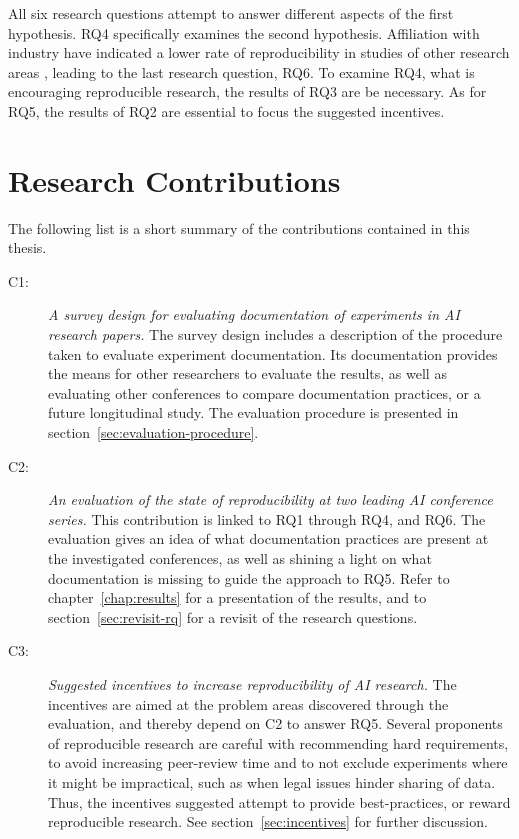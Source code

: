 All six research questions attempt to answer different aspects of the first hypothesis. RQ4 specifically examines the second hypothesis. Affiliation with industry have indicated a lower rate of reproducibility in studies of other research areas \citep{Collberg2016}, leading to the last research question, RQ6. To examine RQ4, what is encouraging reproducible research, the results of RQ3 are be necessary. As for RQ5, the results of RQ2 are essential to focus the suggested incentives.

\section{Research Contributions}
The following list is a short summary of the contributions contained in this thesis.

\begin{description}
    \item[C1:] \emph{A survey design for evaluating documentation of experiments in AI research papers.}
    The survey design includes a description of the procedure taken to evaluate experiment documentation. Its documentation provides the means for other researchers to evaluate the results, as well as evaluating other conferences to compare documentation practices, or a future longitudinal study. The evaluation procedure is presented in section~\ref{sec:evaluation-procedure}.
    \item[C2:] \emph{An evaluation of the state of reproducibility at two leading AI conference series.}
    This contribution is linked to RQ1 through RQ4, and RQ6. The evaluation gives an idea of what documentation practices are present at the investigated conferences, as well as shining a light on what documentation is missing to guide the approach to RQ5. Refer to chapter~\ref{chap:results} for a presentation of the results, and to section~\ref{sec:revisit-rq} for a revisit of the research questions.
    \item[C3:] \emph{Suggested incentives to increase reproducibility of AI research.}
    The incentives are aimed at the problem areas discovered through the evaluation, and thereby depend on C2 to answer RQ5. Several proponents of reproducible research are careful with recommending hard requirements, to avoid increasing peer-review time and to not exclude experiments where it might be impractical, such as when legal issues hinder sharing of data. Thus, the incentives suggested attempt to provide best-practices, or reward reproducible research. See section~\ref{sec:incentives} for further discussion.
\end{description}

